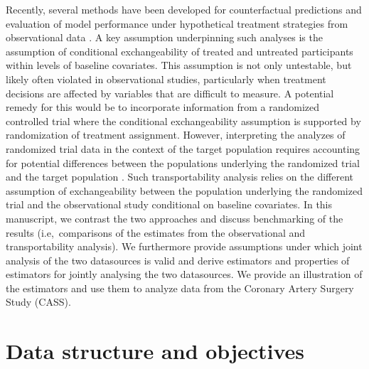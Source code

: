 \documentclass[11pt]{article}
\begin{document}
Recently, several methods have been developed for counterfactual predictions and evaluation of model performance under hypothetical treatment strategies from observational data \cite{boyer2023new,keogh2023prediction,sperrin_using_2018,dickerman_predicting_2022, kim2022doubly}. A key assumption underpinning such analyses is the assumption of conditional exchangeability of treated and untreated participants within levels of baseline covariates.  This assumption is not only untestable, but likely often violated in observational studies, particularly when treatment decisions are affected by variables that are difficult to measure. A potential remedy for this would be to incorporate information from a randomized controlled trial where the  conditional exchangeability assumption is supported by randomization of treatment assignment. However, interpreting the analyzes of randomized trial data in the context of the target population requires accounting for potential differences between the populations underlying the randomized trial and the target population \cite{steingrimsson_transporting_2023,morrison_robust_nodate}. Such transportability analysis relies on the different assumption of exchangeability between the population underlying the randomized trial and the observational study conditional on baseline covariates. In this manuscript, we contrast the two approaches and discuss benchmarking of the results (i.e,~comparisons of the estimates from the observational and transportability analysis). We furthermore provide assumptions under which joint analysis of the two datasources is valid and derive estimators and properties of estimators for jointly analysing the two datasources. We provide an illustration of the estimators and use them to analyze data from the Coronary Artery Surgery Study (CASS).


\section*{Data structure and objectives}
\end{document}
